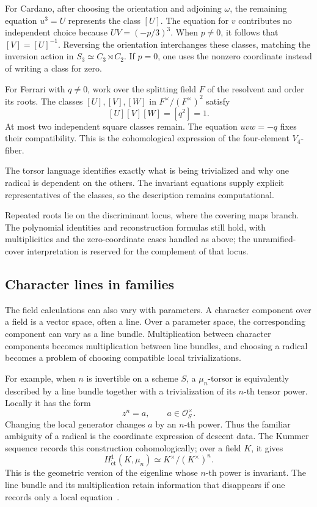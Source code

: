 \documentclass[11pt]{article}
\theoremstyle{remark}
\begin{document}
For Cardano, after choosing the orientation and adjoining \(\omega\), the remaining equation \(u^3=U\) represents the class \([U]\). The equation for \(v\) contributes no independent choice because \(UV=(-p/3)^3\). When \(p\ne0\), it follows that \([V]=[U]^{-1}\). Reversing the orientation interchanges these classes, matching the inversion action in \(S_3\simeq C_3\rtimes C_2\). If \(p=0\), one uses the nonzero coordinate instead of writing a class for zero.

For Ferrari with \(q\ne0\), work over the splitting field \(F\) of the resolvent and order its roots. The classes \([U],[V],[W]\) in \(F^\times/(F^\times)^2\) satisfy
\[
[U][V][W]=[q^2]=1.
\]
At most two independent square classes remain. The equation \(uvw=-q\) fixes their compatibility. This is the cohomological expression of the four-element \(V_4\)-fiber.

The torsor language identifies exactly what is being trivialized and why one radical is dependent on the others. The invariant equations supply explicit representatives of the classes, so the description remains computational.

Repeated roots lie on the discriminant locus, where the covering maps branch. The polynomial identities and reconstruction formulas still hold, with multiplicities and the zero-coordinate cases handled as above; the unramified-cover interpretation is reserved for the complement of that locus.

\subsection{Character lines in families}

The field calculations can also vary with parameters. A character component over a field is a vector space, often a line. Over a parameter space, the corresponding component can vary as a line bundle. Multiplication between character components becomes multiplication between line bundles, and choosing a radical becomes a problem of choosing compatible local trivializations.

For example, when \(n\) is invertible on a scheme \(S\), a \(\mu_n\)-torsor is equivalently described by a line bundle together with a trivialization of its \(n\)-th tensor power. Locally it has the form
\[
z^n=a,\qquad a\in\mathcal O_S^\times.
\]
Changing the local generator changes \(a\) by an \(n\)-th power. Thus the familiar ambiguity of a radical is the coordinate expression of descent data. The Kummer sequence records this construction cohomologically; over a field \(K\), it gives
\[
H^1_{\mathrm{\acute et}}(K,\mu_n)
\simeq K^\times/(K^\times)^n.
\]
This is the geometric version of the eigenline whose \(n\)-th power is invariant. The line bundle and its multiplication retain information that disappears if one records only a local equation~\cite{stacks-kummer}.
\end{document}
